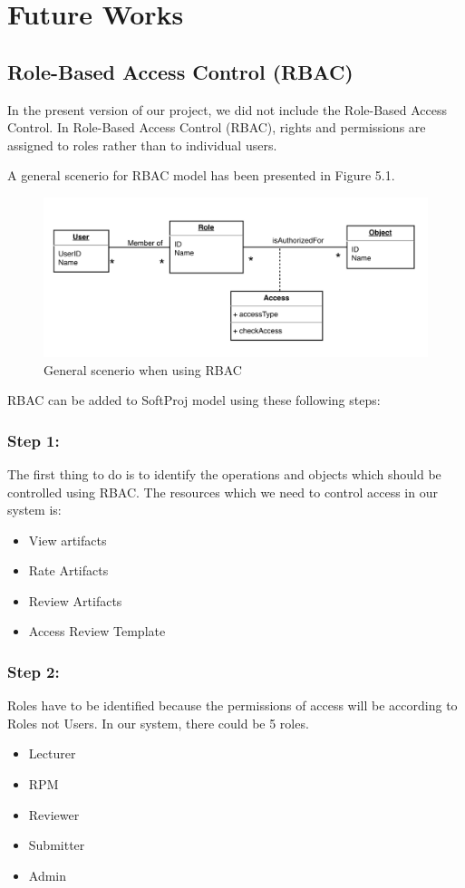 \chapter{Future Works}
\label{sec:future}
\section{Role-Based Access Control (RBAC)}
In the present version of our project, we did not include the Role-Based Access Control. In Role-Based Access Control (RBAC), rights and permissions are assigned to roles rather than to individual users. 

A general scenerio for RBAC model has been presented in Figure 5.1.
\begin{figure}[h]
\includegraphics[width=14cm]{content/A.png}
\centering
\caption{General scenerio when using RBAC}
\end{figure}


RBAC can be added to SoftProj model using these following steps:

\subsection*{Step 1:}
The first thing to do is to identify the operations and objects which should be controlled using RBAC. The resources which we need to control access in our system is:
\begin{itemize}
\itemsep-1.3em 
    \item View artifacts
\item Rate Artifacts
\item Review Artifacts
\item Access Review Template
\end{itemize}




\subsection*{Step 2:}
Roles have to be identified because the permissions of access will be according to Roles not Users. In our system, there could be 5 roles. 
\begin{itemize}
\itemsep-1.3em 
    \item Lecturer
    \item RPM
    \item Reviewer
    \item Submitter
    \item Admin
\end{itemize}




